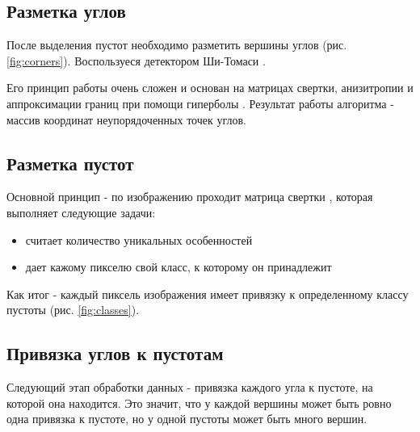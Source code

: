 \documentclass[a4paper, 14pt]{article}
\begin{document}
\subsection{Разметка углов}
\label{corner_mark}
После выделения пустот необходимо разметить вершины углов (рис. \ref{fig:corners}). 
Воспользуеся детектором Ши-Томаси \cite{corners}.

Его принцип работы очень сложен и основан на матрицах свертки, анизитропии и аппроксимации границ при помощи гиперболы \cite{detectors}. Результат работы алгоритма - массив координат неупорядоченных точек углов.  

\subsection{Разметка пустот}
\label{region_mark}

Основной принцип - по изображению проходит матрица свертки \cite{ndi_label}, которая выполняет следующие задачи:
\begin{itemize}
	\item считает количество уникальных особенностей
	
	\item дает кажому пикселю свой класс, к которому он принадлежит
\end{itemize}

Как итог - каждый пиксель изображения имеет привязку к определенному классу пустоты (рис. \ref{fig:classes}).

\subsection{Привязка углов к пустотам}

Следующий этап обработки данных - привязка каждого угла к пустоте, на которой она находится. 
Это значит, что у каждой вершины может быть ровно одна привязка к пустоте, но у одной пустоты может быть много вершин. 
\end{document}
